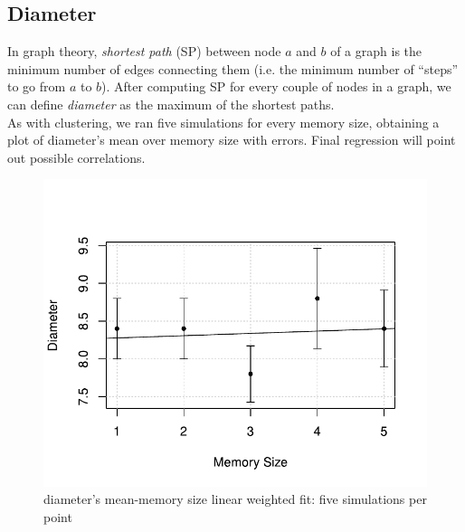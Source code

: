 \subsection{Diameter} \label{diameter}
In graph theory, \textit{shortest path} (SP) between node $a$ and $b$ of a graph is the minimum number of edges connecting them (i.e. the minimum number of ``steps'' to go from $a$ to $b$).
After computing SP for every couple of nodes in a graph, we can define \textit{diameter} as the maximum of the shortest paths.\\
As with clustering, we ran five  simulations for every memory size, obtaining a plot of diameter's mean over memory size with errors. Final regression will point out possible correlations.
\begin{figure}[h]
  \centering
  \includegraphics[trim={0cm 0cm 0cm 1cm},clip,width=.8\columnwidth]{img/diameter.pdf}
  \caption{diameter's mean-memory size linear weighted fit: five simulations per point}
  \label{fig:diameter}
\end{figure}


